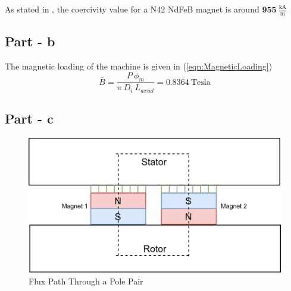 \documentclass{article}
\begin{document}
As stated in \cite{e-magnetsuk}, the coercivity value for a N42 NdFeB magnet is around $\pmb{955} \: \pmb{\mathrm{\frac{kA}{m}}}$

\subsection{Part - b}
The magnetic loading of the machine is given in (\ref{eqn:MagneticLoading})
\begin{equation} \label{eqn:MagneticLoading}
    \bar{B} = \frac{P\:\phi_{m}}{\pi \: D_i \: L_{axial}} = 0.8364 \: \mathrm{Tesla}
\end{equation}

\subsection{Part - c}
\begin{figure}[h!]
\centering
\includegraphics[scale=1.2]{Figures/FluxPath.png}
\caption{Flux Path Through a Pole Pair }
\label{fig:FluxPath}
\end{figure}
\end{document}
